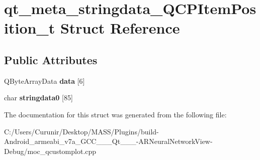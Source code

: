 \hypertarget{structqt__meta__stringdata___q_c_p_item_position__t}{}\section{qt\+\_\+meta\+\_\+stringdata\+\_\+\+Q\+C\+P\+Item\+Position\+\_\+t Struct Reference}
\label{structqt__meta__stringdata___q_c_p_item_position__t}
\subsection*{Public Attributes}
\begin{DoxyCompactItemize}
\item 
\mbox{\label{structqt__meta__stringdata___q_c_p_item_position__t_ab2b7dd58b657ce7cc679abd101877fec}} 
Q\+Byte\+Array\+Data {\bfseries data} \mbox{[}6\mbox{]}
\item 
\mbox{\label{structqt__meta__stringdata___q_c_p_item_position__t_ac38ddbb55a8ec7d4ef047d6e0ebd4f98}} 
char {\bfseries stringdata0} \mbox{[}85\mbox{]}
\end{DoxyCompactItemize}


The documentation for this struct was generated from the following file\+:\begin{DoxyCompactItemize}
\item 
C\+:/\+Users/\+Curunir/\+Desktop/\+M\+A\+S\+S/\+Plugins/build-\/\+Android\+\_\+armeabi\+\_\+v7a\+\_\+\+G\+C\+C\+\_\+\_\+\_\+\+Qt\+\_\+\_\+\_-\/\+A\+R\+Neural\+Network\+View-\/\+Debug/moc\+\_\+qcustomplot.\+cpp\end{DoxyCompactItemize}
